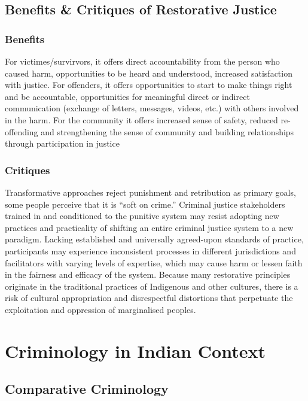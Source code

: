 \documentclass{article}
\begin{document}
\subsection{Benefits \& Critiques of Restorative Justice}

\subsubsection*{Benefits}

For victimes/survirvors, it offers direct accountability from the person who caused harm, opportunities to be heard and understood, increased satisfaction with justice. For offenders, it offers opportunities to start to make things right and be accountable, opportunities for meaningful direct or indirect communication (exchange of letters, messages, videos, etc.) with others involved in the harm. For the community it offers increased sense of safety, reduced re-offending and strengthening the sense of community and  building relationships through participation in justice

\subsubsection*{Critiques}

Transformative approaches reject punishment and retribution as primary goals, some people perceive that it is “soft on crime.” Criminal justice stakeholders trained in and conditioned to the punitive system may resist adopting new practices and practicality of shifting an entire criminal justice system to a new paradigm. Lacking established and universally agreed-upon standards of practice, participants may experience inconsistent processes in different jurisdictions and facilitators with varying levels of expertise, which may cause harm or lessen faith in the fairness and efficacy of the system. Because many restorative principles originate in the traditional practices of Indigenous and other cultures, there is a risk of cultural appropriation and disrespectful distortions that perpetuate the exploitation and oppression of marginalised peoples.

\section{Criminology in Indian Context}

\subsection{Comparative Criminology}
\end{document}
